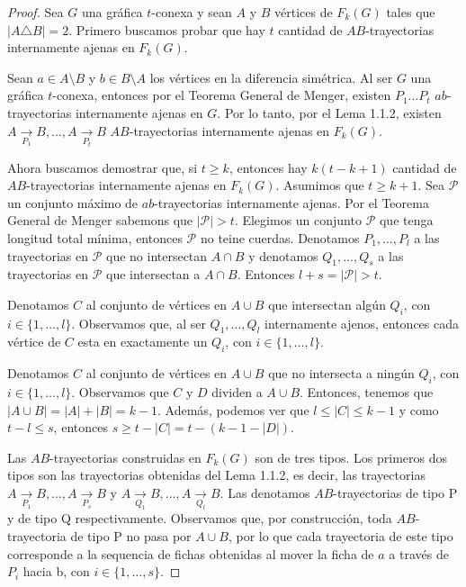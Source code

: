 \begin{proof}
    Sea $G$ una gr\'afica $t$-conexa y sean $A$ y $B$ v\'ertices de $F_{k}(G)$
    tales que $|A \triangle B| = 2$. Primero buscamos probar que hay $t$
    cantidad de $AB$-trayectorias internamente ajenas en $F_{k}(G)$. 
    
    Sean $a \in A \setminus B$ y $b \in B \setminus A$ los v\'ertices en la
    diferencia sim\'etrica. Al ser $G$ una gr\'afica $t$-conexa, entonces por el
    Teorema General de Menger, existen $P_{1} \dots P_{t}$ $ab$-trayectorias
    internamente ajenas en $G$. Por lo tanto, por el Lema 1.1.2, existen $A
    \xrightarrow[P_1]{}  B, \dots, A \xrightarrow[P_t]{}  B$ $AB$-trayectorias
    internamente ajenas en $F_{k}(G)$. 

    Ahora buscamos demostrar que, si $t \geq k$, entonces hay $k(t- k +1)$
    cantidad de $AB$-trayectorias internamente ajenas en $F_{k}(G)$. Asumimos
    que $t \geq k + 1$. Sea $\mathcal{P}$ un conjunto m\'aximo de
    $ab$-trayectorias internamente ajenas. Por el Teorema General de Menger
    sabemons que $|\mathcal{P}|>t$. Elegimos un conjunto $\mathcal{P}$ que tenga
    longitud total m\'inima, entonces $\mathcal{P}$ no teine cuerdas. Denotamos
    $P_{1}, \dots, P_{l}$ a las trayectorias en $\mathcal{P}$ que no intersectan
    $A \cap B$ y denotamos $Q_{1}, \dots, Q_{s}$ a las trayectorias en
    $\mathcal{P}$ que intersectan a $A \cap B$. Entonces $l + s = |\mathcal{P}|
    > t$.

    Denotamos $C$ al conjunto de v\'ertices en $A \cup B$ que intersectan
    alg\'un $Q_i$, con $i \in \{1, \dots, l\}$. Observamos que, al ser $Q_1,
    \dots, Q_l$ internamente ajenos, entonces cada v\'ertice de $C$ esta en
    exactamente un $Q_i$, con $i \in \{1, \dots, l\}$. 

    Denotamos $C$ al conjunto de v\'ertices en $A \cup B$ que no intersecta a
    ning\'un $Q_i$, con $i \in \{1, \dots, l\}$. Observamos que $C$ y $D$
    dividen a $A \cup B$. Entonces, tenemos que $|A\cup B| = |A| + |B| = k-1$.
    Adem\'as, podemos ver que $l \leq |C| \leq k-1$ y como $ t - l \leq s$,
    entonces $s \geq t -|C| = t- (k-1-|D|)$.

    Las $AB$-trayectorias construidas en $F_{k}(G)$ son de tres tipos. Los
    primeros dos tipos son las trayectorias obtenidas del Lema 1.1.2, es decir,
    las trayectorias $A \xrightarrow[P_1]{}  B, \dots, A \xrightarrow[P_s]{}  B$
    y $A \xrightarrow[Q_1]{}  B, \dots, A \xrightarrow[Q_l]{}  B$. Las denotamos
    $AB$-trayectorias de tipo P y de tipo Q respectivamente. Observamos que, por
    construcci\'on, toda $AB$-trayectoria de tipo P no pasa por $A\cup B$, por
    lo que cada trayectoria de este tipo corresponde a la sequencia de fichas
    obtenidas al mover la ficha de $a$ a trav\'es de $P_i$ hacia b, con $i \in
    \{1, \dots, s\}$.

\end{proof}

